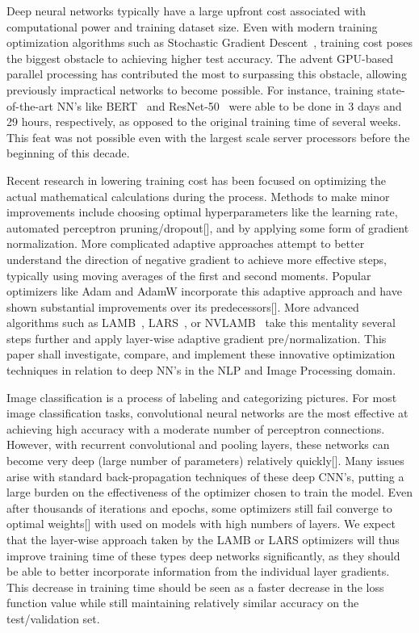 Deep neural networks typically have a large upfront cost associated with computational power and training dataset size. Even with modern training optimization algorithms such as Stochastic Gradient Descent~\cite{SGD}, training cost poses the biggest obstacle to achieving higher test accuracy. The advent GPU-based parallel processing has contributed the most to surpassing this obstacle, allowing previously impractical networks to become possible. For instance, training state-of-the-art NN's like BERT~\cite{bert} and ResNet-50~\cite{resnet} were able to be done in 3 days and 29 hours, respectively, as opposed to the original training time of several weeks. This feat was not possible even with the largest scale server processors before the beginning of this decade. 

Recent research in lowering training cost has been focused on optimizing the actual mathematical calculations during the process. Methods to make minor improvements include choosing optimal hyperparameters like the learning rate, automated perceptron pruning/dropout[], and by applying some form of gradient normalization. More complicated adaptive approaches attempt to better understand the direction of negative gradient to achieve more effective steps, typically using moving averages of the first and second moments. Popular optimizers like Adam and AdamW incorporate this adaptive approach and have shown substantial improvements over its predecessors[]. More advanced algorithms such as LAMB~\cite{You2020Large}, LARS~\cite{qian2020impact, ginsburg2018large}, or NVLAMB~\cite{nvidia_nvlamb}  take this mentality several steps further and apply layer-wise adaptive gradient pre/normalization. This paper shall investigate, compare, and implement these innovative optimization techniques in relation to deep NN's in the NLP and Image Processing domain. 

Image classification is a process of labeling and categorizing pictures. For most image classification tasks, convolutional neural networks are the most effective at achieving high accuracy with a moderate number of perceptron connections. However, with recurrent convolutional and pooling layers, these networks can become very deep (large number of parameters) relatively quickly[]. Many issues arise with standard back-propagation techniques of these deep CNN's, putting a large burden on the effectiveness of the optimizer chosen to train the model. Even after thousands of iterations and epochs, some optimizers still fail converge to optimal weights[] with used on models with high numbers of layers. We expect that the layer-wise approach taken by the LAMB or LARS optimizers will thus improve training time of these types deep networks significantly, as they should be able to better incorporate information from the individual layer gradients. This decrease in training time should be seen as a faster decrease in the loss function value while still maintaining relatively similar accuracy on the test/validation set.

